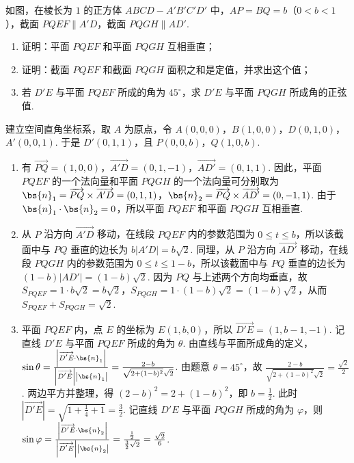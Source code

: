 \begin{problem}
如图，在棱长为 \(1\) 的正方体 \(ABCD - A'B'C'D'\) 中，\(AP = BQ = b\)（\(0 < b < 1\)），截面 \(PQEF \parallel A'D\)，截面 \(PQGH \parallel AD'\).

\begin{enumerate}
\item 证明：平面 \(PQEF\) 和平面 \(PQGH\) 互相垂直；
\item 证明：截面 \(PQEF\) 和截面 \(PQGH\) 面积之和是定值，并求出这个值；
\item 若 \(D'E\) 与平面 \(PQEF\) 所成的角为 \(45^{\circ}\)，求 \(D'E\) 与平面 \(PQGH\) 所成角的正弦值.
\end{enumerate}

\end{problem}

\begin{solution}
建立空间直角坐标系，取 \(A\) 为原点，令 \(A(0,0,0)\)，\(B(1,0,0)\)，\(D(0,1,0)\)，\(A'(0,0,1)\). 于是 \(D'(0,1,1)\)，且 \(P(0,0,b)\)，\(Q(1,0,b)\).
\begin{enumerate}
\item 有 \(\overrightarrow{PQ}=(1,0,0)\)，\(\overrightarrow{A'D}=(0,1,-1)\)，\(\overrightarrow{AD'}=(0,1,1)\). 因此，平面 \(PQEF\) 的一个法向量和平面 \(PQGH\) 的一个法向量可分别取为 \(\bs{n}_1=\overrightarrow{PQ}\times\overrightarrow{A'D}=(0,1,1)\)，\(\bs{n}_2=\overrightarrow{PQ}\times\overrightarrow{AD'}=(0,-1,1)\). 由于 \(\bs{n}_1\cdot\bs{n}_2=0\)，所以平面 \(PQEF\) 和平面 \(PQGH\) 互相垂直.

\item 从 \(P\) 沿方向 \(\overrightarrow{A'D}\) 移动，在线段 \(PQEF\) 内的参数范围为 \(0\leqslant t\leqslant b\)，所以该截面中与 \(PQ\) 垂直的边长为 \(b\left|A'D\right|=b\sqrt{2}\). 同理，从 \(P\) 沿方向 \(\overrightarrow{AD'}\) 移动，在线段 \(PQGH\) 内的参数范围为 \(0\leqslant t\leqslant1-b\)，所以该截面中与 \(PQ\) 垂直的边长为 \((1-b)\left|AD'\right|=(1-b)\sqrt{2}\). 因为 \(PQ\) 与上述两个方向均垂直，故 \(S_{PQEF}=1\cdot b\sqrt{2}=b\sqrt{2}\)，\(S_{PQGH}=1\cdot(1-b)\sqrt{2}=(1-b)\sqrt{2}\)，从而 \(S_{PQEF}+S_{PQGH}=\sqrt{2}\).

\item 平面 \(PQEF\) 内，点 \(E\) 的坐标为 \(E(1,b,0)\)，所以 \(\overrightarrow{D'E}=(1,b-1,-1)\). 记直线 \(D'E\) 与平面 \(PQEF\) 所成的角为 \(\theta\). 由直线与平面所成角的定义，\(\sin\theta=\frac{\left|\overrightarrow{D'E}\cdot\bs{n}_1\right|}{\left|\overrightarrow{D'E}\right|\left|\bs{n}_1\right|}=\frac{2-b}{\sqrt{2+(1-b)^2}\sqrt{2}}\). 由题意 \(\theta=45^\circ\)，故 \(\frac{2-b}{\sqrt{2+(1-b)^2}\sqrt{2}}=\frac{\sqrt{2}}{2}\). 两边平方并整理，得 \((2-b)^2=2+(1-b)^2\)，即 \(b=\frac{1}{2}\). 此时 \(\left|\overrightarrow{D'E}\right|=\sqrt{1+\frac{1}{4}+1}=\frac{3}{2}\). 记直线 \(D'E\) 与平面 \(PQGH\) 所成的角为 \(\varphi\)，则 \(\sin\varphi=\frac{\left|\overrightarrow{D'E}\cdot\bs{n}_2\right|}{\left|\overrightarrow{D'E}\right|\left|\bs{n}_2\right|}=\frac{\frac{1}{2}}{\frac{3}{2}\sqrt{2}}=\frac{\sqrt{2}}{6}\).
\end{enumerate}
\end{solution}


